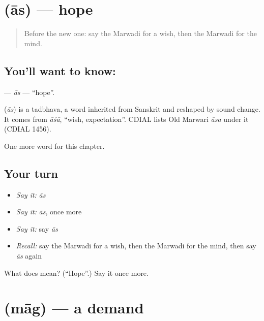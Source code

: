 \section[\texorpdfstring{\mw{आस} (ās)}{आस (ās)}]{ (ās) — hope}

\label{lesson:MW-C111-as}



\begin{quote}
Before the new one: say the Marwadi for a wish, then the Marwadi for the mind.
\end{quote}

\subsection*{You'll want to know: }
\textbf{} — \emph{ās} — \textquotedblleft{}hope\textquotedblright{}.

\begin{cousinweb}
\textbf{} (\emph{ās}) is a tadbhava, a word inherited from Sanskrit and reshaped by sound change. It comes from \emph{āśā}, \textquotedblleft{}wish, expectation\textquotedblright{}. CDIAL lists Old Marwari \emph{āsa} under it (CDIAL 1456).
\end{cousinweb}

\begin{grammarlens}[title={What you've built}]
One more word for this chapter.
\end{grammarlens}

\subsection*{Your turn}
\begin{itemize}
\raggedright
  \item \emph{Say it:} \emph{ās}
  \item \emph{Say it:} \emph{ās}, once more
  \item \emph{Say it:} say \emph{ās}
  \item \emph{Recall:} say the Marwadi for a wish, then the Marwadi for the mind, then say \emph{ās} again
\end{itemize}

\begin{tcolorbox}[breakable,colback=teal!4,colframe=teal!35!black,title={Before you move on}]
What does  mean? (\textquotedblleft{}Hope\textquotedblright{}.) Say it once more.
\end{tcolorbox}
\section[\texorpdfstring{\mw{मांग} (mā̃g)}{मांग (mā̃g)}]{ (mā̃g) — a demand}

